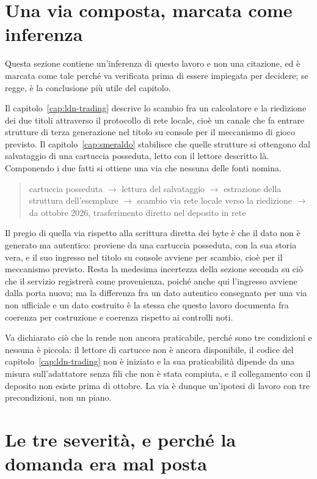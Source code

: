 \section{Una via composta, marcata come inferenza}

Questa sezione contiene un'inferenza di questo lavoro e non una citazione, ed è marcata come tale perché va verificata prima di essere impiegata per decidere; se regge, è la conclusione più utile del capitolo.

Il capitolo~\ref{cap:ldn-trading} descrive lo scambio fra un calcolatore e la riedizione dei due titoli attraverso il protocollo di rete locale, cioè un canale che fa entrare strutture di terza generazione nel titolo su console per il meccanismo di gioco previsto. Il capitolo~\ref{cap:smeraldo} stabilisce che quelle strutture si ottengono dal salvataggio di una cartuccia posseduta, letto con il lettore descritto là. Componendo i due fatti si ottiene una via che nessuna delle fonti nomina.

\begin{quote}
cartuccia posseduta $\rightarrow$ lettura del salvataggio $\rightarrow$ estrazione della struttura dell'esemplare $\rightarrow$ scambio via rete locale verso la riedizione $\rightarrow$ da ottobre 2026, trasferimento diretto nel deposito in rete
\end{quote}

Il pregio di quella via rispetto alla scrittura diretta dei byte è che il dato non è generato ma autentico: proviene da una cartuccia posseduta, con la sua storia vera, e il suo ingresso nel titolo su console avviene per scambio, cioè per il meccanismo previsto. Resta la medesima incertezza della sezione seconda su ciò che il servizio registrerà come provenienza, poiché anche qui l'ingresso avviene dalla porta nuova; ma la differenza fra un dato autentico consegnato per una via non ufficiale e un dato costruito è la stessa che questo lavoro documenta fra coerenza per costruzione e coerenza rispetto ai controlli noti.

Va dichiarato ciò che la rende non ancora praticabile, perché sono tre condizioni e nessuna è piccola: il lettore di cartucce non è ancora disponibile, il codice del capitolo~\ref{cap:ldn-trading} non è iniziato e la sua praticabilità dipende da una misura sull'adattatore senza fili che non è stata compiuta, e il collegamento con il deposito non esiste prima di ottobre. La via è dunque un'ipotesi di lavoro con tre precondizioni, non un piano.

\section{Le tre severità, e perché la domanda era mal posta}

